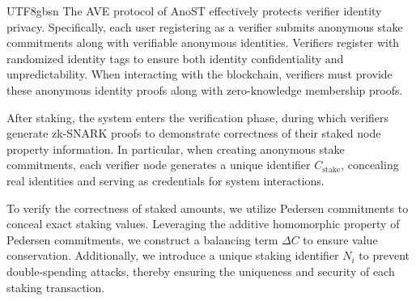 \documentclass[runningheads]{llncs}
\begin{document}
\begin{CJK*}{UTF8}{gbsn}
The AVE protocol of AnoST effectively protects verifier identity privacy. Specifically, each user registering as a verifier submits anonymous stake commitments along with verifiable anonymous identities. Verifiers register with randomized identity tags to ensure both identity confidentiality and unpredictability. When interacting with the blockchain, verifiers must provide these anonymous identity proofs along with zero-knowledge membership proofs.

After staking, the system enters the verification phase, during which verifiers generate zk-SNARK proofs to demonstrate correctness of their staked node property information. In particular, when creating anonymous stake commitments, each verifier node generates a unique identifier $C_{\text{stake}}$, concealing real identities and serving as credentials for system interactions.

To verify the correctness of staked amounts, we utilize Pedersen commitments to conceal exact staking values. Leveraging the additive homomorphic property of Pedersen commitments, we construct a balancing term $\Delta C$ to ensure value conservation. Additionally, we introduce a unique staking identifier $N_i$ to prevent double-spending attacks, thereby ensuring the uniqueness and security of each staking transaction.


\begin{figure}[h!]

	\centering
 \small
\end{figure}
\end{CJK*}
\end{document}
